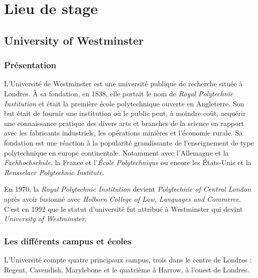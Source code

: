 \chapter{Lieu de stage}

\section{University of Westminster}

\subsection{Pr\'esentation}

L'Universit\'e de Westminster est une universit\'e publique de recherche situ\'ee \`a Londres. 
\`A sa fondation, en 1838, elle portait le nom de \textit{Royal Polytechnic Institution} et \'etait la premi\`ere \'ecole polytechnique ouverte en Angleterre.
Son but \'etait de fournir une institution o\`u le public peut, \`a moindre co\^ut, acqu\'erir une connaissance pratique des divers arts et branches de la science en rapport avec les fabricants industriels, les op\'erations mini\`eres et l'\'economie rurale.
Sa fondation est une r\'eaction \`a la popularit\'e grandissante de l'enseignement de type polytechnique en europe continentale. 
Notamment avec l'Allemagne et la \textit{Fachhochschule}, la France et l'\textit{\'Ecole Polytechnique} ou encore les \'Etats-Unis et la \textit{Rensselaer Polytechnic Institute}.

En 1970, la \textit{Royal Polytechnic Institution} devient \textit{Polytechnic of Central London} apr\`es avoir fusionn\'e avec \textit{Holborn College of Law, Languages and Commerce}.
C'est en 1992 que le statut d'universit\'e fut attribu\'e \`a Westminster qui devint \textit{University of Westminster}.

\subsection{Les diff\'erents campus et \'ecoles}
\label{section:campus}

L'Universit\'e compte quatre principaux campus, trois dans le centre de Londres : Regent, Cavendish, Marylebone et le quatri\`eme \`a Harrow, \`a l'ouest de Londres.

